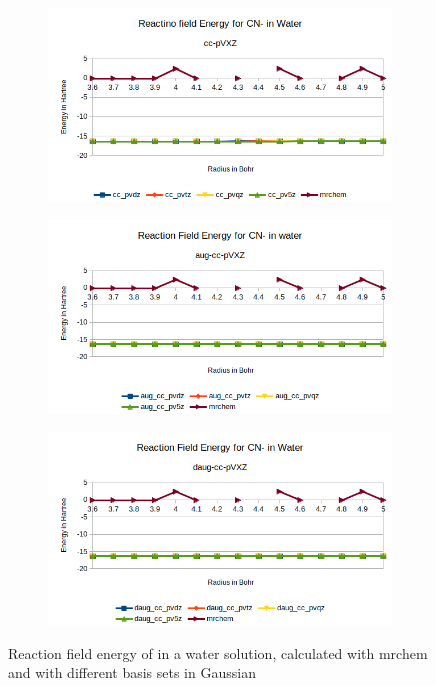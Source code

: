 \documentclass[../master_thesis.tex]{subfiles}
\begin{document}
\begin{figure}[h!]
  \centering
  \begin{subfigure}[b]{\linewidth}
    \includegraphics[width=\linewidth]{img/Ercyan.png}
  \end{subfigure}
  \begin{subfigure}[b]{\linewidth}
    \includegraphics[width=\linewidth]{img/Eraugcyan.png}
  \end{subfigure}
  \begin{subfigure}[b]{\linewidth}
    \includegraphics[width=\linewidth]{img/Erdaugcyan.png}
  \end{subfigure}
  \caption{Reaction field energy of  in a water solution, calculated with mrchem
  and with different basis sets in Gaussian}
  \label{fig:cyanEnergyplots}
\end{figure}
\end{document}

